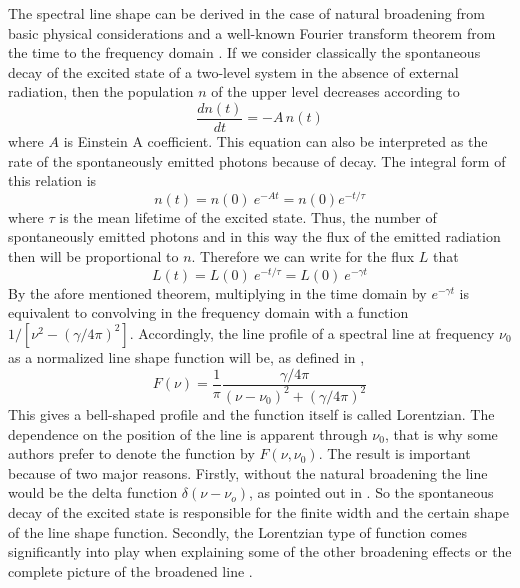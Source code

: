 The spectral line shape can be derived in the case of natural
broadening from basic physical considerations and a well-known Fourier
transform theorem from the time to the frequency domain \citep{thorne:99}. If we
consider classically the spontaneous decay of the excited state of a
two-level system in the absence of external radiation, then the population
$n$ of the upper level decreases according to
\begin{equation}\label{eq:abs_theory:spon_decay_diff}
  \frac{dn(t)}{dt} = -A\,n(t)
\end{equation}
where $A$ is Einstein A coefficient. This equation can also be
interpreted as the rate of the spontaneously emitted photons because
of decay. The integral form of this relation is 
\begin{equation}\label{eq:abs_theory:spon_decay_exp}
  n(t)=n(0)~e^{-At}=n(0)e^{-t/\tau}
\end{equation}
where $ \tau$ is the mean lifetime of the excited state. Thus, the
number of spontaneously emitted photons and in this way the flux of
the emitted radiation then will be proportional to $n$. Therefore we
can write for the flux $L$ that
\begin{equation}\label{eq:abs_theory:flux}
  L(t)=L(0)~e^{-t/ \tau}=L(0)~e^{-\gamma t}
\end{equation}
By the afore mentioned theorem, multiplying in the time domain by
$e^{-\gamma t}$ is equivalent to convolving in the frequency domain
with a function $1/[\nu^2 - (\gamma/4\pi)^2]$. Accordingly, the line
profile of a spectral line at frequency $ \nu_0$ as a normalized
line shape function will be, as defined in \citet{thorne:99},
\begin{equation}\label{eq:abs_theory:natural_lorentz}
  F(\nu)=\frac{1}{\pi}\frac{\gamma/4\pi}{(\nu - \nu_0)^2 + (\gamma/4\pi)^2}
\end{equation}
This gives a bell-shaped profile and the function itself is called
Lorentzian. The dependence on the position of the line is apparent
through $\nu_0$, that is why some authors prefer to denote the
function by $F(\nu,\nu_0)$.  The result is important because of two
major reasons.  Firstly, without the natural broadening the line would
be the delta function $\delta (\nu - \nu_o)$, as pointed out in
\citet{bernath:95}. So the spontaneous decay of the excited state is
responsible for the finite width and the certain shape of the
line shape function. Secondly, the Lorentzian type of function comes
significantly into play when explaining some of the other broadening
effects or the complete picture of the broadened line \citep{thorne:99}.

